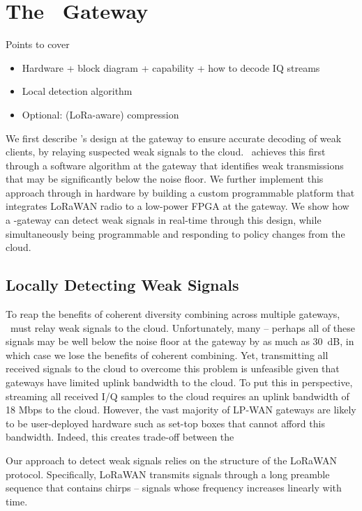 \section{The \name\ Gateway}
\label{sec:gateway}

{\color{blue} Points to cover
\begin{itemize}
    \item Hardware + block diagram + capability + how to decode IQ streams
    \item Local detection algorithm
    \item Optional: (LoRa-aware) compression
\end{itemize}

}

We first describe \name's design at the gateway to ensure accurate decoding of weak clients, by relaying suspected weak signals to the cloud. \name\ achieves this first through a software algorithm at the gateway that identifies weak transmissions that may be significantly below the noise floor. We further implement this approach through in hardware by building a custom programmable platform that integrates LoRaWAN radio to a low-power FPGA at the gateway. We show how a \name-gateway can detect weak signals in real-time through this design, while simultaneously being programmable and responding to policy changes from the cloud. 

\subsection{Locally Detecting Weak Signals}
\label{sec:local-detection}
To reap the benefits of coherent diversity combining across multiple gateways, \name\ must relay weak signals to the cloud. Unfortunately, many -- perhaps all of these signals may be well below the noise floor at the gateway by as much as 30~dB, in which case we lose the benefits of coherent combining. Yet, transmitting all received signals to the cloud to overcome this problem is unfeasible given that gateways have limited uplink bandwidth to the cloud. To put this in perspective, streaming all received I/Q samples to the cloud requires an uplink bandwidth of 18 Mbps to the cloud. However, the vast majority of LP-WAN gateways are likely to be user-deployed hardware such as set-top boxes that cannot afford this bandwidth. Indeed, this creates  trade-off between the 

Our approach to detect weak signals relies on the structure of the LoRaWAN protocol. Specifically, LoRaWAN transmits signals through a long preamble sequence that contains chirps -- signals whose frequency increases linearly with time. 

